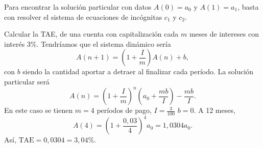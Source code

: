 \begin{observation}
\normalfont Para encontrar la solución particular con datos $\displaystyle A\left(0\right) = a_{0} $ y $\displaystyle A\left(1\right) = a_{1} $, basta con resolver el sistema de ecuaciones de incógnitas $\displaystyle c_{1} $ y $\displaystyle c_{2} $.
\end{observation}
\begin{eg}
\normalfont Calcular la TAE, de una cuenta con capitalización cada $\displaystyle m $ meses de intereses con interés $\displaystyle 3\% $. Tendríamos que el sistema dinámico sería
\[A\left(n+1\right) = \left(1+\frac{I}{m}\right)A\left(n\right) + b ,\]
con $\displaystyle b $ siendo la cantidad aportar a detraer al finalizar cada período. La solución particular será
\[A\left(n\right) = \left(1 + \frac{I}{m}\right)^{n}\left(a_{0} + \frac{mb}{I}\right)-\frac{mb}{I} .\]
En este caso se tienen $\displaystyle m = 4 $ períodos de pago, $\displaystyle I = \frac{3}{100} $ $\displaystyle b = 0 $. A 12 meses,
\[A\left(4\right) = \left(1 + \frac{0,03}{4}\right)^{4} a_{0}= 1,0304 a_{0} .\]
Así, $\displaystyle \text{TAE} = 0,0304 = 3,04 \% $.
\end{eg}

